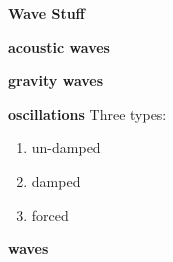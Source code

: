 \documentclass[12pt]{article}
\begin{document}
\begin{centering}
    \Large\textbf{Wave Stuff}\normalsize
\end{centering}

\textbf{acoustic waves}

\textbf{gravity waves}

\textbf{oscillations}
Three types:
\begin{enumerate}
    \item un-damped
    \item damped
    \item forced
\end{enumerate}

\textbf{waves}
\end{document}

